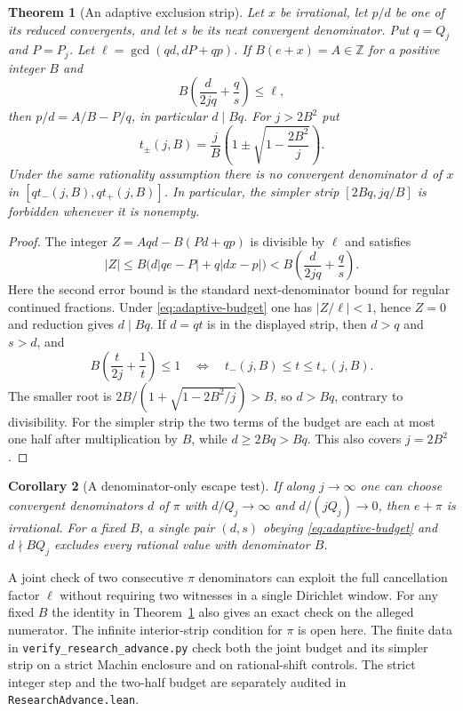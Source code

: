 \documentclass[11pt]{amsart}
\newtheorem{theorem}{Theorem}[section]
\newtheorem{corollary}[theorem]{Corollary}
\theoremstyle{definition}
\theoremstyle{remark}
\numberwithin{equation}{section}
\newcommand{\Z}{\mathbb{Z}}
\begin{document}
\begin{theorem}[An adaptive exclusion strip]\label{thm:adaptive-strip}
Let $x$ be irrational, let $p/d$ be one of its reduced convergents,
and let $s$ be its next convergent denominator. Put $q=Q_j$ and
$P=P_j$. Let $\ell=\gcd(qd,dP+qp)$. If $B(e+x)=A\in\Z$ for a
positive integer $B$ and
\begin{equation}\label{eq:adaptive-budget}
 B\left(\frac{d}{2jq}+\frac{q}{s}\right)\le\ell,
\end{equation}
then $p/d=A/B-P/q$, in particular $d\mid Bq$.
For $j>2B^2$ put
\[
 t_\pm(j,B)=\frac{j}{B}\left(1\pm\sqrt{1-\frac{2B^2}{j}}\right).
\]
Under the same rationality assumption there is no convergent
denominator $d$ of $x$ in $[qt_-(j,B),qt_+(j,B)]$.
In particular, the simpler strip $[2Bq,jq/B]$ is forbidden whenever
it is nonempty.
\end{theorem}
\begin{proof}
The integer $Z=Aqd-B(Pd+qp)$ is divisible by $\ell$ and satisfies
\[
 |Z|\le B\bigl(d|qe-P|+q|dx-p|\bigr)
 < B\left(\frac{d}{2jq}+\frac{q}{s}\right).
\]
Here the second error bound is the standard next-denominator bound
for regular continued fractions. Under \eqref{eq:adaptive-budget}
one has $|Z/\ell|<1$, hence $Z=0$ and reduction gives $d\mid Bq$.
If $d=qt$ is in the displayed strip, then $d>q$ and $s>d$, and
\[
 B\left(\frac{t}{2j}+\frac1t\right)\le1
 \quad\Longleftrightarrow\quad t_-(j,B)\le t\le t_+(j,B).
\]
The smaller root is $2B/(1+\sqrt{1-2B^2/j})>B$, so $d>Bq$,
contrary to divisibility. For the simpler strip the two terms of the
budget are each at most one half after multiplication by $B$, while
$d\ge2Bq>Bq$. This also covers $j=2B^2$.
\end{proof}
\begin{corollary}[A denominator-only escape test]\label{cor:strip-escape}
If along $j\to\infty$ one can choose convergent denominators $d$ of
$\pi$ with $d/Q_j\to\infty$ and $d/(jQ_j)\to0$, then $e+\pi$ is
irrational. For a fixed $B$, a single pair $(d,s)$ obeying
\eqref{eq:adaptive-budget} and $d\nmid BQ_j$ excludes every rational
value with denominator $B$.
\end{corollary}
A joint check of two consecutive $\pi$ denominators can exploit
the full cancellation factor $\ell$ without requiring two witnesses
in a single Dirichlet window.
For any fixed $B$ the identity in Theorem~\ref{thm:adaptive-strip}
also gives an exact check on the alleged numerator. The infinite
interior-strip condition for $\pi$ is open here. The finite data in
\texttt{verify\_research\_advance.py} check both the joint budget and
its simpler strip on a strict Machin enclosure and on rational-shift
controls. The strict integer step and the two-half budget are
separately audited in \texttt{ResearchAdvance.lean}.
\end{document}
